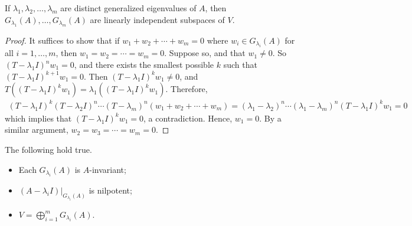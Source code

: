 \begin{lemma}
    If $\lambda_{1},\lambda_{2},\ldots,\lambda_{m}$ are distinct generalized eigenvalues of $A$, then $G_{\lambda_{1}}(A),\ldots,G_{\lambda_{m}}(A)$ are linearly independent subspaces of $V$.
\end{lemma}

\begin{proof}
    It suffices to show that if $w_{1}+w_{2}+\cdots+w_{m} = 0$ where $w_{i} \in G_{\lambda_{i}}(A)$ for all $i = 1,\ldots,m$, then $w_{1} = w_{2} = \cdots = w_{m} = 0$. Suppose so, and that $w_{1} \neq 0$. So $(T-\lambda_{1}I)^{n} w_{1} = 0$, and there exists the smallest possible $k$ such that $(T-\lambda_{1}I)^{k+1} w_{1} = 0$. Then $(T-\lambda_{1} I)^{k} w_{1} \neq 0$, and $T((T-\lambda_{1}I)^{k} w_{1}) = \lambda_{1}((T-\lambda_{1}I)^{k} w_{1})$. Therefore,
    \begin{align}
        (T-\lambda_{1}I)^{k} (T-\lambda_{2}I)^{n} \cdots (T-\lambda_{m})^{n} (w_{1}+w_{2}+\cdots+w_{m}) = (\lambda_{1}-\lambda_{2})^{n} \cdots (\lambda_{1}-\lambda_{m})^{n} (T-\lambda_{1}I)^{k} w_{1} = 0
    \end{align}
    which implies that $(T-\lambda_{1}I)^{k} w_{1} = 0$, a contradiction. Hence, $w_{1} = 0$. By a similar argument, $w_{2} = w_{3} = \cdots = w_{m} = 0$.
\end{proof}

\begin{proposition}
    The following hold true.
    \begin{itemize}
        \item Each $G_{\lambda_{i}}(A)$ is $A$-invariant;
        \item $(A-\lambda_{i}I) \big|_{G_{\lambda_{i}}(A)}$ is nilpotent;
        \item $V = \bigoplus_{i=1}^{m} G_{\lambda_{i}}(A)$.
    \end{itemize}
\end{proposition}

